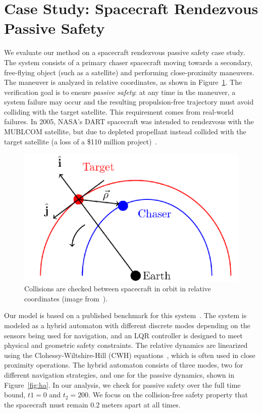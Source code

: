 \section{Case Study: Spacecraft Rendezvous Passive Safety}
\label{sec:casestudy}

We evaluate our method on a spacecraft rendezvous passive safety case study. The system consists of a primary chaser spacecraft moving towards a secondary, free-flying object (such as a satellite) and performing close-proximity maneuvers.
%
The maneuver is analyzed in relative coordinates, as shown in Figure~\ref{fig:chaser}.
%
The verification goal is to ensure \emph{passive safety}: at any time in the maneuver, a system failure may occur and the resulting propulsion-free trajectory must avoid colliding with the target satellite.
%
This requirement comes from real-world failures. In 2005, NASA’s DART spacecraft was intended to rendezvous with the MUBLCOM satellite, but due to depleted propellant instead collided with the target satellite (a loss of a
\$110 million project)~\cite{croomes2006overview}.

\begin{figure}[t]
\centerline{\includegraphics[width=0.5\columnwidth]{images/chaser.png}}
\caption{Collisions are checked between spacecraft in orbit in relative coordinates (image from~\cite{chan2017verifying}).}
\label{fig:chaser}
\end{figure}

Our model is based on a published benchmark for this system~\cite{chan2017verifying,jewison2016spacecraft}. The system is modeled as a hybrid automaton with different discrete modes depending on the sensors being used for navigation, and an LQR controller is designed to meet physical and geometric safety constraints.
%
The relative dynamics are linearized using the Clohessy-Wiltshire-Hill (CWH) equations~\cite{wh1960terminal}, which is often used in close proximity operations. The hybrid automaton consists of three modes, two for different navigation strategies, and one for the passive dynamics, shown in Figure~\ref{fig:ha}.
%
In our analysis, we check for passive safety over the full time bound, $t1=0$ and $t_2=200$.
%
We focus on the collision-free safety property that the spacecraft must remain 0.2 meters apart at all times.

